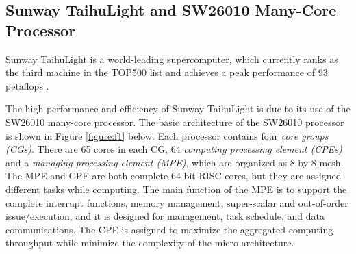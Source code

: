 \documentclass[10pt,journal,compsoc]{IEEEtran}
\begin{document}
\subsection{Sunway TaihuLight and SW26010 Many-Core Processor}
Sunway TaihuLight is a world-leading supercomputer, which currently ranks as the third machine in the TOP500 list\cite{top500} and achieves a peak performance of 93 petaflops \cite{fu2016sunway}. 

The high performance and efficiency of Sunway TaihuLight is due to its use of the SW26010 many-core processor. The basic architecture of the SW26010 processor is shown in Figure \ref{figure:f1} below. Each processor contains four \emph{core groups (CGs)}. There are 65 cores in each CG, 64 \emph{computing processing element (CPEs)} and a \emph{managing processing element (MPE)}, which are organized as 8 by 8 mesh. The MPE and CPE are both complete 64-bit RISC cores, but they are assigned different tasks while computing. The main function of the MPE is to support the complete interrupt functions, memory management, super-scalar and out-of-order issue/execution, and it is designed for management, task schedule, and data communications. The CPE is assigned to maximize the aggregated computing throughput while minimize the complexity of the micro-architecture. 
\end{document}
